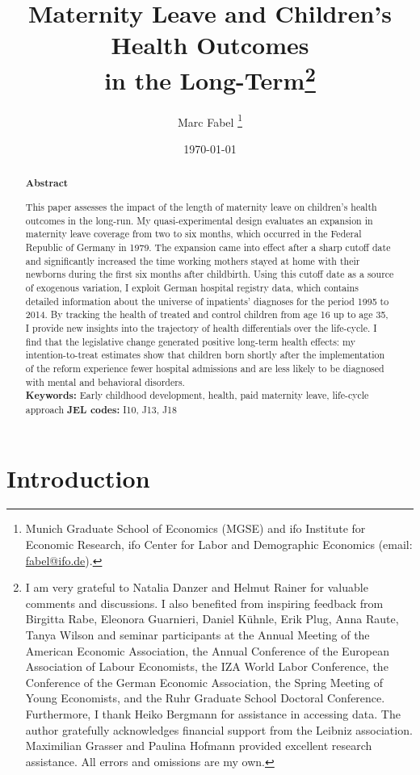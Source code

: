 \documentclass[11pt, a4paper]{article} %
\title{Maternity Leave and Children's Health Outcomes\\ in the Long-Term\footnote{I am very grateful to Natalia Danzer and Helmut Rainer for valuable comments and discussions. I also benefited from inspiring feedback from Birgitta Rabe, Eleonora Guarnieri, Daniel Kühnle, Erik Plug, Anna Raute, Tanya Wilson and seminar participants at the Annual Meeting of the American Economic Association, the Annual Conference of the European Association of Labour Economists, the IZA World Labor Conference, the Conference of the German Economic Association, the Spring Meeting of Young Economists, and the Ruhr Graduate School Doctoral Conference. Furthermore, I thank Heiko Bergmann for assistance in accessing data. The author gratefully acknowledges financial support from the Leibniz association. Maximilian Grasser and Paulina Hofmann provided excellent research assistance. All errors and omissions are my own.
}}
\author{
	Marc Fabel 
		\thanks{Munich Graduate School of Economics (MGSE) and ifo Institute for Economic Research, ifo Center for Labor and Demographic Economics (email: \href{mailto:fabel@ifo.de}{fabel@ifo.de}).
		}
}
\date{\monthyeardate\today}
\begin{document}
\setcounter{page}{1}    
\maketitle

\renewcommand{\abstractname}{\vspace{-\baselineskip}} %

  \begin{abstract}\noindent 
   \footnotesize{\begin{center}\textbf{Abstract}\end{center} This paper assesses the impact of the length of maternity leave on children’s health outcomes in the long-run. My quasi-experimental design evaluates an expansion in maternity leave coverage from two to six months, which occurred in the Federal Republic of Germany in 1979. The expansion came into effect after a sharp cutoff date and significantly increased the time working mothers stayed at home with their newborns during the first six months after childbirth. Using this cutoff date as a source of exogenous variation, I exploit German hospital registry data, which contains detailed information about the universe of inpatients' diagnoses for the period 1995 to 2014. 
   By tracking the health of treated and control children from age 16 up to age 35, I provide new insights into the trajectory of health differentials over the life-cycle. I find that the legislative change generated positive long-term health effects: my intention-to-treat estimates show that children born shortly after the implementation of the reform experience fewer hospital admissions and are less likely to be diagnosed with mental and behavioral disorders.
   	\\\newline \textbf{Keywords:} Early childhood development, health, paid maternity leave, life-cycle approach \newline \textbf{JEL codes:} I10, J13, J18}
    \end{abstract}

\newpage


\section{Introduction}\label{sec:introduction}
\end{document}
